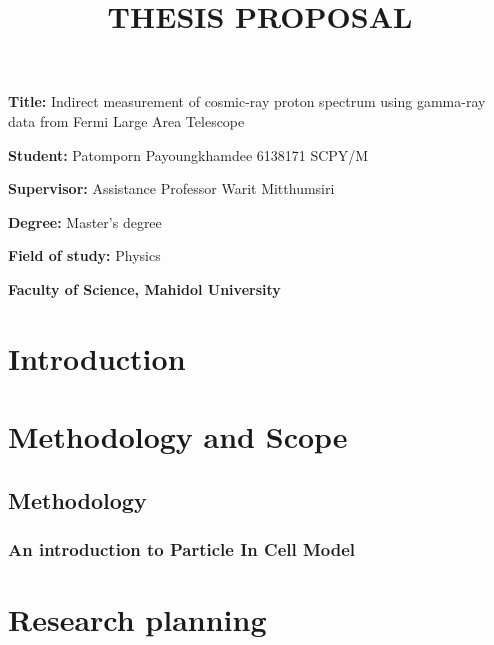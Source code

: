 \documentclass[12pt, a4paper]{article}
\title{THESIS PROPOSAL}
\author{}
\date{}
\newcommand{\namelistlabel}[1]{\mbox{#1}\hfil}
\newenvironment{namelist}[1]{%
\begin{list}{}
    {
        \let\makelabel\namelistlabel
        \settowidth{\labelwidth}{#1}
        \setlength{\leftmargin}{1.1\labelwidth}
    }
  }{%
\end{list}}
\begin{document}
\maketitle

\begin{namelist}{xxxxxxxxxxxx}
\item[{\bf Title:}]
	Indirect measurement of cosmic-ray proton spectrum using gamma-ray data from Fermi Large Area Telescope
\item[{\bf Student:}]
	Patomporn Payoungkhamdee 6138171 SCPY/M
\item[{\bf Supervisor:}]
	Assistance Professor Warit Mitthumsiri
\item[{\bf Degree:}]
	Master's degree
\item[{\bf Field of study:}]
	Physics
\item[{\bf Faculty of Science,  Mahidol University }]
\end{namelist}

\section{Introduction}


\section{Methodology and Scope}
\subsection*{Methodology}
\subsubsection*{ An introduction to Particle In Cell Model}

\section{Research planning}
\end{document}
